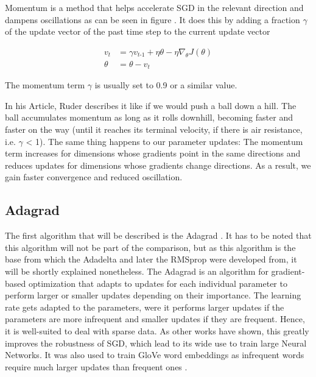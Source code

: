 \documentclass[12pt,oneside,a4paper,parskip]{scrbook}
\begin{document}
Momentum \cite{QIAN1999145, overvieDiffRSLVQ} is a method that helps accelerate SGD in the relevant direction and dampens
oscillations as can be seen in figure . It does this by adding a fraction $\gamma $ of the update vector of the past time step to the
current update vector

\begin{equation}
\begin{split}
\textit{v}_\textit{t} &= \gamma\textit{v}_\textit{t-1} + \eta \theta - \eta\nabla_\theta \textit{J}(\theta) \\
\theta &= \theta - \textit{v}_\textit{t}
\end{split}
\end{equation}

The momentum term $\gamma $ is usually set to 0.9 or a similar value.

In his Article, Ruder \cite{overvieDiffRSLVQ} describes it like if we would push a ball down a hill. 
The ball accumulates momentum as long as it rolls downhill, becoming faster and faster on the way 
(until it reaches its terminal velocity, if there is air resistance, i.e. $\gamma $ < 1). 
The same thing happens to our parameter updates: The momentum term increases for dimensions whose gradients
point in the same directions and reduces updates for dimensions whose gradients change directions.
As a result, we gain faster convergence and reduced oscillation.

\subsection{Adagrad}
The first algorithm that will be described is the Adagrad \cite{Zeiler2012ADADELTAAA}. It has to be noted that this 
algorithm will not be part of the comparison, but as this algorithm is the base from which the Adadelta and later the 
RMSprop were developed from, it will be shortly explained nonetheless.
The Adagrad is an algorithm for gradient-based optimization that adapts to updates for each individual parameter to 
perform larger or smaller updates depending on their importance. The learning rate gets adapted to the parameters, were
it performs larger updates if the parameters are more infrequent and smaller updates if they are frequent.
Hence, it is well-suited to deal with sparse data. As other works \cite{dean2012large} have shown, this greatly improves
the robustness of SGD, which lead to its wide use to train large Neural Networks.
It was also used to train GloVe word embeddings as infrequent words require
much larger updates than frequent ones \cite{pennington2014glove, overvieDiffRSLVQ}.   
\end{document}
